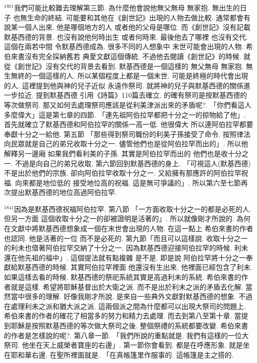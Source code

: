 \documentclass{book}
\begin{document}
$^{1801}$我們可能比較難去理解第三節.
為什麼他會說他無父無母 無家抱.
無出生的日子 也無生命的終結.
可能要和其他在《創世記》出現的人物去做比較.
通常都會有說某一個人出來.
他是哪個地方的人 或者他的父母是哪位.
而《創世記》沒有記載默基西德的背景.
也沒有說他何時出生 或者何時來.
最後他去了哪裡 也沒有交代.
這個在兩若中間 令默基西德成為.
很多不同的人想象中 末世可能會出現的人物.
希伯來書沒有完全採納舊若 典愛文獻這個傳統.
不過他去閱讀《創世記》的時候.
就從《創世記》沒有交代的背景去看到.
默基西德是一個這樣的 無父無母 無家抱.
無生無終的一個這樣的人.
所以某個程度上都是一個末世.
可能是終極的時代會出現的人.
這裡提到他與神的兒子近似 永遠作祭司.
就將神的兒子與默基西德的關係進一步拉近.
提到默基西德 引用《詩篇》110篇去確立.
的確有祭司是按默基西德的等次做祭司.
那又如何去處理祭司應該是從利美津派出來的矛盾呢?.
「你們看這人多麼偉大」這是第七章的四節.
「連先祖阿伯拉罕都把十分之一的掠物給了他」.
首先就確立了默基西德和阿伯拉罕的關係一高一低.
他很偉大 所以連阿伯拉罕都要奉獻十分之一給他.
第五節 「那些得到祭司職份的利美子孫接受了命令.
按照律法向民眾就是自己的弟兄收取十分之一.
儘管他們也是從阿伯拉罕而出的」.
所以他解釋另一邊廂 如果我們看利美的子孫.
其實是阿伯拉罕而出的 他們也是收十分之一.
不過是向自己的弟兄收取.
第六節回到默基西德的身上.
「可視這人(默基西德)不是出於他們的宗族.
卻向阿伯拉罕收取十分之一.
又給擁有那應許的阿伯拉罕祝福.
向來都是地位低的 接受地位高的祝福.
這是無可爭議的」.
所以第六至七節再次提出默基西德的地位高過阿伯拉罕.

$^{1841}$因為是默基西德祝福阿伯拉罕.
第八節 「一方面收取十分之一的都是必死的人.
但另一方面 這個收取十分之一的卻被證明是活著的」.
所以就像剛才所說的.
為何在文獻中將默基西德想象成一個在末世會出現的人物.
在這一點上 希伯來書的作者也認同.
他是活著的一位 而不是必死的.
第九節「而且可以這樣說.
收取十分之一的利未也借著阿伯拉罕交納了十分之一.
因為默基西德迎接阿伯拉罕的時候.
利未還在他先祖的福中」.
這個提法就有點複雜 是不是.
即是說 阿伯拉罕將十分之一奉獻給默基西德的時候.
其實阿伯拉罕裡面 他還沒有生出來.
他裡面已經包含了利未.
如果這樣去看的時候.
默基西德的祭祀系統其實是高過利未的系統.
希伯來書的作者就是這樣.
希望將耶穌基督出於大衛之派.
而不是出於利未之派的矛盾去化解.
當然當中很多的理解.
好像我剛才所說.
是來自一些典外文獻對默基西德的想象.
不過在處理利未之派和猶大派之派.
這兩個派之間為什麼都可以出現大祭司的問題上.
希伯來書的作者的確花了相當多的努力和精力去處理.
而去到第八至第十章.
當提到耶穌是按照默基西德的等次做大祭司之後.
整個祭禮的系統都要改變.
希伯來書的作者是怎樣說的呢?.
第八章一節.
「我們所說的重點就是.
我們有這樣的一位大祭司.
他坐在天上威榮者寶座的右邊」.
第一節你會看到.
都是在呼應形象.
就是坐在耶和華右邊.
在聖所裡面就是.
「在真帳篷里作服事的.
這帳篷是主之搭的.
\end{document}
